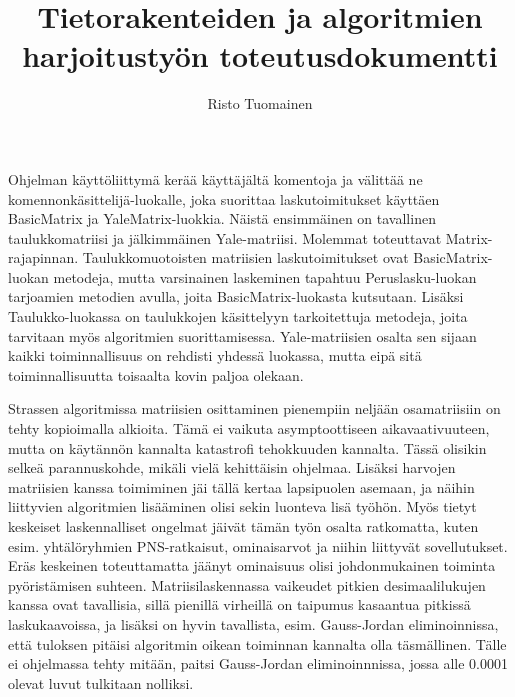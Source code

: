 \documentclass[a4paper]{article}
\title{Tietorakenteiden ja algoritmien harjoitustyön toteutusdokumentti}
\author{Risto Tuomainen}
\begin{document}
\maketitle
\noindent
\section*{}

Ohjelman käyttöliittymä kerää käyttäjältä komentoja ja välittää ne komennonkäsittelijä-luokalle, joka suorittaa laskutoimitukset käyttäen BasicMatrix ja YaleMatrix-luokkia. Näistä ensimmäinen on tavallinen taulukkomatriisi ja jälkimmäinen Yale-matriisi. Molemmat toteuttavat Matrix-rajapinnan. Taulukkomuotoisten matriisien laskutoimitukset ovat BasicMatrix-luokan metodeja, mutta varsinainen laskeminen tapahtuu Peruslasku-luokan tarjoamien metodien avulla, joita BasicMatrix-luokasta kutsutaan. Lisäksi Taulukko-luokassa on taulukkojen käsittelyyn tarkoitettuja metodeja, joita tarvitaan myös algoritmien suorittamisessa. Yale-matriisien osalta sen sijaan kaikki toiminnallisuus on rehdisti yhdessä luokassa, mutta eipä sitä toiminnallisuutta toisaalta kovin paljoa olekaan. 

Strassen algoritmissa matriisien osittaminen pienempiin neljään osamatriisiin on tehty kopioimalla alkioita. Tämä ei vaikuta asymptoottiseen aikavaativuuteen, mutta on käytännön kannalta katastrofi tehokkuuden kannalta. Tässä olisikin selkeä parannuskohde, mikäli vielä kehittäisin ohjelmaa. Lisäksi harvojen matriisien kanssa toimiminen jäi tällä kertaa lapsipuolen asemaan, ja näihin liittyvien algoritmien lisääminen olisi sekin luonteva lisä työhön. Myös tietyt keskeiset laskennalliset ongelmat jäivät tämän työn osalta ratkomatta, kuten esim. yhtälöryhmien PNS-ratkaisut, ominaisarvot ja niihin liittyvät sovellutukset. Eräs keskeinen toteuttamatta jäänyt ominaisuus olisi johdonmukainen toiminta pyöristämisen suhteen. Matriisilaskennassa vaikeudet pitkien desimaalilukujen kanssa ovat tavallisia, sillä pienillä virheillä on taipumus kasaantua pitkissä laskukaavoissa, ja lisäksi on hyvin tavallista, esim. Gauss-Jordan eliminoinnissa, että tuloksen pitäisi algoritmin oikean toiminnan kannalta olla täsmällinen. Tälle ei ohjelmassa tehty mitään, paitsi Gauss-Jordan eliminoinnnissa, jossa alle 0.0001 olevat luvut tulkitaan nolliksi.
\end{document}

